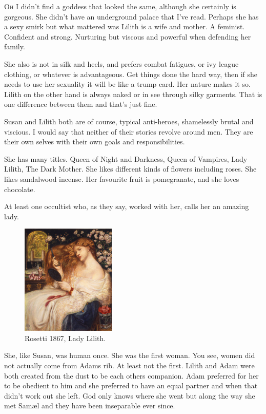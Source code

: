 \lettrine[lines=2,lraise=0]{O}h I didn't find a goddess that looked the same, although she certainly is gorgeous. She didn't have an underground palace that I've read. Perhaps she has a sexy smirk but what mattered was Lilith is a wife and mother. A feminist. Confident and strong. Nurturing but viscous and powerful when defending her family.

She also is not in silk and heels, and prefers combat fatigues, or ivy league clothing, or whatever is advantageous. Get things done the hard way, then if she needs to use her sexuality it will be like a trump card. Her nature makes it so. Lilith on the other hand is always naked or in see through silky garments. That is one difference between them and that's just fine. 

Susan and Lilith both are of course, typical anti-heroes, shamelessly brutal and viscious. I would say that neither of their stories revolve around men. They are their own selves with their own goals and responsibilities.

	
She has many titles. Queen of Night and Darkness, Queen of Vampires, Lady Lilith, The Dark Mother. She likes different kinds of flowers including roses. She likes sandalwood incense. Her favourite fruit is pomegranate, and she loves chocolate.

At least one occultist who, as they say, worked with her, calls her an amazing lady.


\begin{figure}
	\centering
	\includegraphics[width=0.40\textwidth]{Images/Rossetti_lady_lilith_1867}
	\\ {\small Rosetti 1867, Lady Lilith.}
\end{figure}


She, like Susan, was human once. She was the first woman. You see, women did not actually come from Adams rib. At least not the first. Lilith and Adam were both created from the dust to be each others companion. Adam preferred for her to be obedient to him and she preferred to have an equal partner and when that didn't work out she left. God only knows where she went but along the way she met Sam\ae l and they have been inseparable ever since.

